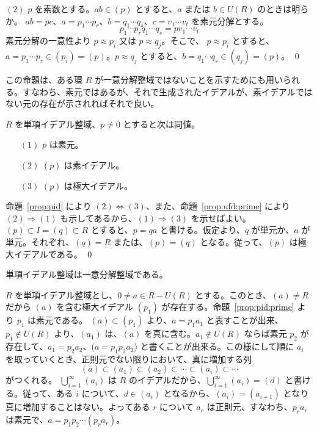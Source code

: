 $(2)$ $p$ を素数とする。$ab\in (p)$ とすると、$a$ または $b\in U(R)$ のときは明らか。
$ab = pc$、$a = p_1\cdots p_r$、$b = q_1\cdots q_s$、$c = v_1\cdots v_t$ を素元分解とする。
$$p_1\cdots p_rq_1\cdots q_s = pv_1\cdots v_t$$
素元分解の一意性より $p\approx p_i$ 又は $p\approx q_j$。そこで、
$p\approx p_i$ とすると、$a = p_1\cdots p_r\in (p_i) = (p)$。$p\approx q_j$ とすると、$b = q_1\cdots q_s\in (q_j) = (p)$。
\qed

\medskip
\note
この命題は、ある環 $R$ が一意分解整域ではないことを示すためにも用いられる。すなわち、素元ではあるが、それで生成されたイデアルが、素イデアルではない元の存在が示されればそれで良い。

\begin{prop} \label{prop:pid:prime}
$R$ を単項イデアル整域、$p\neq 0$ とすると次は同値。
\begin{itemize}
\item[$(1)$] $p$ は素元。
\item[$(2)$] $(p)$ は素イデアル。
\item[$(3)$] $(p)$ は極大イデアル。
\end{itemize}
\end{prop}
\proof
命題~\ref{prop:pid} により $(2)\Leftrightarrow (3)$、また、命題~\ref{prop:ufd:prime} により $(2)\Rightarrow (1)$ も示してあるから、$(1)\Rightarrow (3)$ を示せばよい。
$(p) \subset I = (q) \subset R$ とすると、$p = qa$ と書ける。仮定より、$q$ が単元か、$a$ が単元。それぞれ、$(q) = R$ または、$(p) = (q)$ となる。従って、$(p)$ は極大イデアルである。
\qed

\begin{thm} \label{thm:pidisufd}
単項イデアル整域は一意分解整域である。
\end{thm}
\proof
$R$ を単項イデアル整域とし、$0\neq a\in R - U(R)$ とする。このとき、$(a) \neq R$ だから $(a)$ を含む極大イデアル $(p_1)$ が存在する。命題~\ref{prop:pid:prime} より $p_1$ は素元である。
$(a)\subset (p_1)$ より、$a = p_1a_1$ と表すことが出来、$p_1\not\in U(R)$ より、$(a_1)$ は、$(a)$ を真に含む。$a_1\not\in U(R)$ ならば素元 $p_2$ が存在して、$a_1 = p_2a_2$、($a = p_1p_2a_2$) と書くことが出来る。この様にして順に $a_i$ を取っていくとき、正則元でない限りにおいて、真に増加する列
$$(a) \subset (a_1) \subset (a_2) \subset \cdots \subset (a_i)\subset \cdots$$
がつくれる。
$\bigcup_{i=1}^\infty (a_i)$  は $R$ のイデアルだから、$\bigcup_{i = 1}^\infty (a_i) = (d)$ と書ける。従って、ある $i$ について、$d\in (a_i)$ となるから、$(a_i) = (a_{i+1})$ となり真に増加することはない。よってある $r$ について $a_r$ は正則元、すなわち、$p_ra_r$ は素元で、$a = p_1p_2\cdots (p_ra_r)$。

